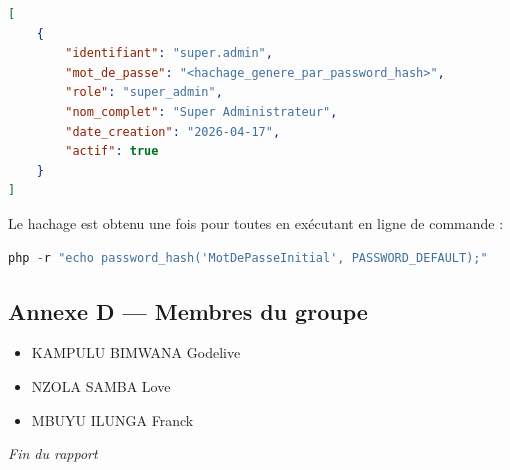 \documentclass[12pt,a4paper]{article}
\begin{document}
\begin{lstlisting}[language=json]
[
    {
        "identifiant": "super.admin",
        "mot_de_passe": "<hachage_genere_par_password_hash>",
        "role": "super_admin",
        "nom_complet": "Super Administrateur",
        "date_creation": "2026-04-17",
        "actif": true
    }
]
\end{lstlisting}

Le hachage est obtenu une fois pour toutes en exécutant en ligne de commande :

\begin{lstlisting}[language=PHP]
php -r "echo password_hash('MotDePasseInitial', PASSWORD_DEFAULT);"
\end{lstlisting}

\subsection*{Annexe D --- Membres du groupe}

\begin{itemize}[leftmargin=1.5em]
    \item KAMPULU BIMWANA Godelive
    \item NZOLA SAMBA Love
    \item MBUYU ILUNGA Franck
\end{itemize}

\vspace{1cm}
\begin{center}
\textit{Fin du rapport}
\end{center}
\end{document}
